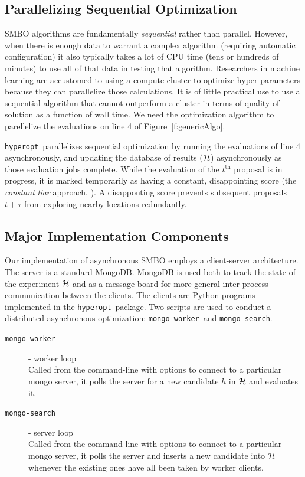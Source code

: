 \documentclass{article}
\newcommand{\hyperopt}{{\tt hyperopt}}
\newcommand{\mongoworker}{{\tt mongo-worker}}
\newcommand{\mongosearch}{{\tt mongo-search}}
\begin{document}
\subsection{Parallelizing Sequential Optimization}

SMBO algorithms are fundamentally {\em sequential} rather than parallel.
However, when there is enough data to warrant a complex algorithm (requiring automatic configuration)
it also typically takes a lot of CPU time (tens or hundreds of minutes) to use all of that data in testing that algorithm.
Researchers in machine learning are accustomed to using a compute cluster
to optimize hyper-parameters because they can parallelize those calculations.
It is of little practical use to use a sequential algorithm that cannot outperform a cluster
in terms of quality of solution as a function of wall time.
We need the optimization algorithm to parellelize the evaluations on line 4 of
Figure~\ref{f:genericAlgo}.

\hyperopt\ parallelizes sequential optimization by running the evaluations of line 4 asynchronously,
and updating the database of results (${\cal H}$) asynchronously as those evaluation jobs complete.
While the evaluation of the $t^{\mathrm{th}}$ proposal is in progress,
it is marked temporarily as having a constant, disappointing score (the {\em constant liar} approach, \cite{ginsbourger+leriche+carraro:2010}).
A disapponting score prevents subsequent proposals $t+\tau$ from exploring nearby locations redundantly.


\subsection{Major Implementation Components}

Our implementation of asynchronous SMBO employs a client-server architecture.
The server is a standard MongoDB.
MongoDB is used both to track the state of the experiment ${\cal H}$ and as a
message board for more general inter-process communication between the clients.
The clients are Python programs implemented in the \hyperopt\ package.
Two scripts are used
to conduct a distributed asynchronous optimization: \mongoworker\ and \mongosearch.


\begin{description}
\item[\mongoworker] - worker loop\\
    Called from the command-line with options to connect to a particular mongo server,
    it polls the server for a new candidate $h$ in ${\cal H}$ and evaluates it.
\item[\mongosearch] - server loop\\
    Called from the command-line with options to connect to a particular mongo server,
    it polls the server and inserts a new candidate into ${\cal H}$ whenever the existing ones
    have all been taken by worker clients.
\end{description}
\end{document}
